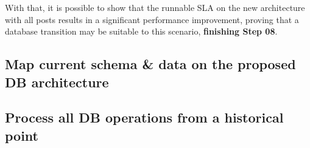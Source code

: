 With that, it is possible to show that the runnable SLA on the new architecture with all posts results in a significant performance improvement, proving that a database transition may be suitable to this scenario, \textbf{finishing Step 08}.


\subsection{Map current schema \& data on the proposed DB architecture}

\subsection{Process all DB operations from a historical point}








